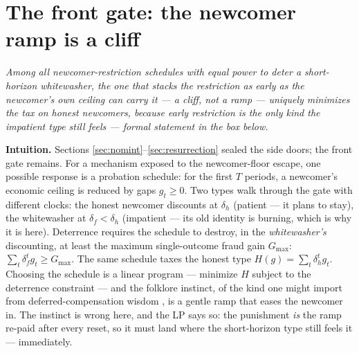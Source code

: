 \documentclass[11pt,a4paper]{article}
\newcommand{\onebreath}[1]{\begin{center}\emph{#1}\end{center}}
\begin{document}
\section{The front gate: the newcomer ramp is a cliff}\label{sec:cliff}

\onebreath{Among all newcomer-restriction schedules with equal power to deter a short-horizon whitewasher, the one that stacks the
restriction as early as the newcomer's own ceiling can carry it --- a cliff, not a ramp --- uniquely minimizes the tax on honest
newcomers, because early restriction is the only kind the impatient type still feels --- formal statement in the box below.}

\textbf{Intuition.} Sections \ref{sec:nomint}--\ref{sec:resurrection} sealed the side doors; the front gate remains. For a mechanism exposed to the newcomer-floor escape, one possible response is a probation schedule: for the first
$T$ periods, a newcomer's economic ceiling is reduced by gaps $g_t\ge 0$. Two types walk through the gate with different clocks:
the honest newcomer discounts at $\delta_h$ (patient --- it plans to stay), the whitewasher at $\delta_f<\delta_h$ (impatient ---
its old identity is burning, which is why it is here). Deterrence requires the schedule to destroy, in the \emph{whitewasher's}
discounting, at least the maximum single-outcome fraud gain $G_{\max}$: $\sum_t\delta_f^t g_t\ge G_{\max}$. The same schedule taxes
the honest type $H(g)=\sum_t\delta_h^t g_t$. Choosing the schedule is a linear program --- minimize $H$ subject to the deterrence
constraint --- and the folklore instinct, of the kind one might import from deferred-compensation wisdom \cite{lazear}, is a
gentle ramp that eases the newcomer in. The instinct is wrong here, and the LP says so: the punishment \emph{is} the ramp re-paid after every reset,
so it must land where the short-horizon type still feels it --- immediately.
\end{document}
